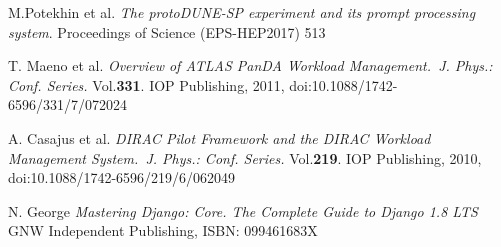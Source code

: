 \documentclass[pdftex,12pt,letter]{article}
\begin{document}
%
% 
%
%


\begin{thebibliography}{99}

 M.Potekhin et al. \emph{The protoDUNE-SP experiment and its prompt
processing system}. Proceedings of Science (EPS-HEP2017) 513

T. Maeno et al. \emph{Overview of ATLAS PanDA Workload Management.~J. Phys.: Conf. Series.} Vol.\textbf{331}. IOP Publishing, 2011,
doi:10.1088/1742-6596/331/7/072024


A. Casajus et al.  \emph{DIRAC Pilot Framework and the DIRAC
Workload Management System.~J. Phys.: Conf. Series.} Vol.\textbf{219}. IOP Publishing, 2010,
doi:10.1088/1742-6596/219/6/062049

N. George \emph{Mastering Django: Core. The Complete Guide to Django 1.8 LTS}~ GNW Independent Publishing, ISBN: 099461683X



\end{thebibliography}
\end{document}
